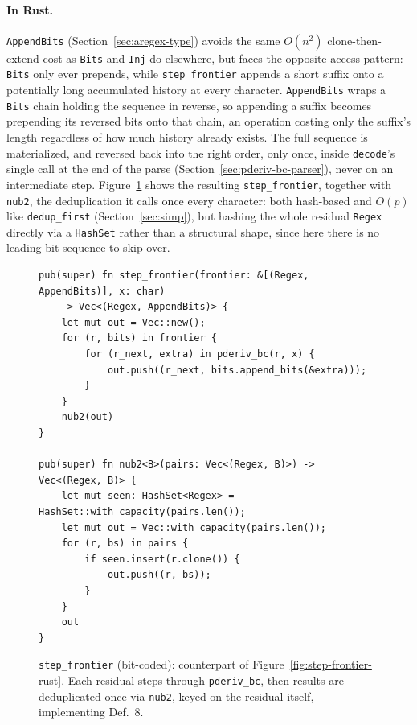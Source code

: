 %

\paragraph{In Rust.}
\label{sec:pderiv-bc-state-set-impl}

\texttt{AppendBits} (Section~\ref{sec:aregex-type}) avoids the same
$O(n^2)$ clone-then-extend cost as \texttt{Bits} and \texttt{Inj} do
elsewhere, but faces the opposite access pattern: \texttt{Bits} only
ever prepends, while \texttt{step\_frontier} appends a short suffix onto
a potentially long accumulated history at every character.
\texttt{AppendBits} wraps a \texttt{Bits} chain holding the sequence in
reverse, so appending a suffix becomes prepending its reversed bits onto
that chain, an operation costing only the suffix's length regardless of
how much history already exists.
The full sequence is materialized, and reversed back into the right
order, only once, inside \texttt{decode}'s single call at the end of the
parse (Section~\ref{sec:pderiv-bc-parser}), never on an intermediate step.
Figure~\ref{fig:step-frontier-bc-rust} shows the resulting
\texttt{step\_frontier}, together with \texttt{nub2}, the
deduplication it calls once every character: both hash-based and
$O(p)$ like \texttt{dedup\_first} (Section~\ref{sec:simp}), but
hashing the whole residual \texttt{Regex} directly via a
\texttt{HashSet} rather than a structural shape, since here there is
no leading bit-sequence to skip over.
\begin{figure}[H]
\small
\begin{verbatim}
pub(super) fn step_frontier(frontier: &[(Regex, AppendBits)], x: char)
    -> Vec<(Regex, AppendBits)> {
    let mut out = Vec::new();
    for (r, bits) in frontier {
        for (r_next, extra) in pderiv_bc(r, x) {
            out.push((r_next, bits.append_bits(&extra)));
        }
    }
    nub2(out)
}

pub(super) fn nub2<B>(pairs: Vec<(Regex, B)>) -> Vec<(Regex, B)> {
    let mut seen: HashSet<Regex> = HashSet::with_capacity(pairs.len());
    let mut out = Vec::with_capacity(pairs.len());
    for (r, bs) in pairs {
        if seen.insert(r.clone()) {
            out.push((r, bs));
        }
    }
    out
}
\end{verbatim}
\caption{\texttt{step\_frontier} (bit-coded): counterpart of
Figure~\ref{fig:step-frontier-rust}. Each residual steps through
\texttt{pderiv\_bc}, then results are deduplicated once via
\texttt{nub2}, keyed on the residual itself, implementing
\citet{sulzmannlu2012} Def.~8.}
\label{fig:step-frontier-bc-rust}
\end{figure}

